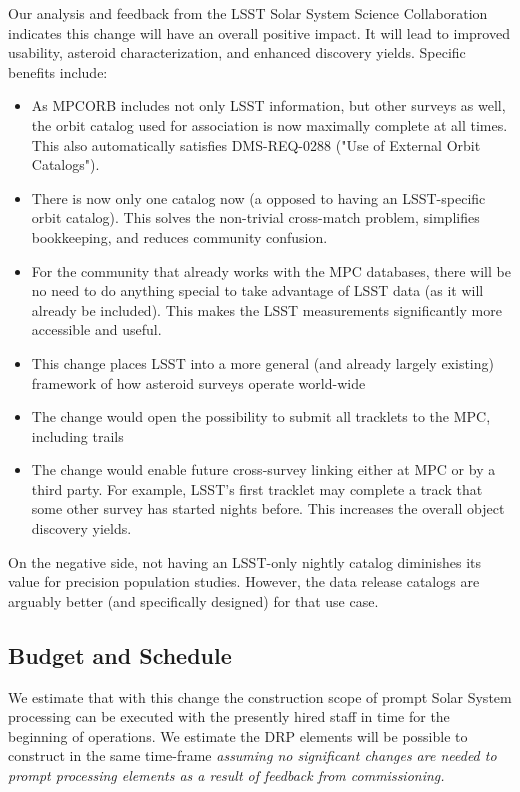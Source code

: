 \documentclass[DM,authoryear,toc]{lsstdoc}
\begin{document}
Our analysis and feedback from the LSST Solar System Science Collaboration indicates this change will have an overall positive impact. It will lead to improved usability, asteroid characterization, and enhanced discovery yields. Specific benefits include:
%
\begin{itemize}
\item As MPCORB includes not only LSST information, but other surveys as well, the orbit catalog used for association is now maximally complete at all times. This also automatically satisfies DMS-REQ-0288 ("Use of External Orbit Catalogs").
\item There is now only one catalog now (a opposed to having an LSST-specific orbit catalog). This solves the non-trivial cross-match problem, simplifies bookkeeping, and reduces community confusion.
\item For the community that already works with the MPC databases, there will be no need to do anything special to take advantage of LSST data (as it will already be included). This makes the LSST measurements significantly more accessible and useful.
\item This change places LSST into a more general (and already largely existing) framework of how asteroid surveys operate
world-wide
\item The change would open the possibility to submit all tracklets to the MPC, including trails
\item The change would enable future cross-survey linking either at MPC or by a third party. For example, LSST’s first tracklet may complete a track that some other survey has started nights before. This increases the overall object discovery yields.
\end{itemize}

On the negative side, not having an LSST-only nightly catalog diminishes its value for precision population studies. However, the data release catalogs are arguably better (and specifically designed) for that use case.

\subsection{Budget and Schedule}

We estimate that with this change the construction scope of prompt Solar System processing can be executed with the presently hired staff in time for the beginning of operations. We estimate the DRP elements will be possible to construct in the same time-frame {\em assuming no significant changes are needed to prompt processing elements as a result of feedback from commissioning.}
\end{document}
